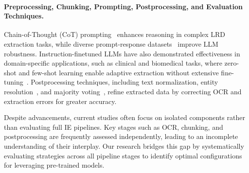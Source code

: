 \paragraph{Preprocessing, Chunking, Prompting, Postprocessing, and Evaluation Techniques.} Chain-of-Thought (CoT) prompting~\cite{wei2022cot} enhances reasoning in complex LRD extraction tasks, while diverse prompt-response datasets~\cite{zmigrod-etal-2024-value} improve LLM robustness. Instruction-finetuned LLMs have also demonstrated effectiveness in domain-specific applications, such as clinical and biomedical tasks, where zero-shot and few-shot learning enable adaptive extraction without extensive fine-tuning~\cite{labrak-etal-2024-zero}. Postprocessing techniques, including text normalization, entity resolution~\cite{hwang2021entityresolution}, and majority voting~\cite{wang2022majority}, refine extracted data by correcting OCR and extraction errors for greater accuracy.

Despite advancements, current studies often focus on isolated components rather than evaluating full IE pipelines. Key stages such as OCR, chunking, and postprocessing are frequently assessed independently, leading to an incomplete understanding of their interplay. Our research bridges this gap by systematically evaluating strategies across all pipeline stages to identify optimal configurations for leveraging pre-trained models.









